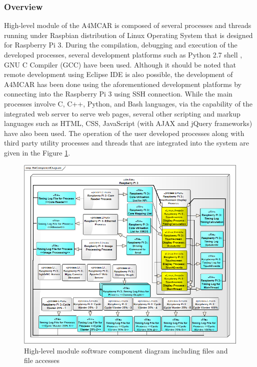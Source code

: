 \subsubsection{Overview}
High-level module of the A4MCAR is composed of several processes and threads running under Raspbian \cite{raspbiandownload} distribution of Linux Operating System that is designed for Raspberry Pi 3.  During the compilation, debugging and execution of the developed processes, several development platforms such as Python 2.7 shell \cite{python27}, GNU C Compiler (GCC) \cite{gcc} have been used. Although it should be noted that remote development using Eclipse IDE \cite{remotedebuggingeclipse} is also possible, the development of A4MCAR has been done using the aforementioned development platforms by connecting into the Raspberry Pi 3 using SSH connection. While the main processes involve C, C++, Python, and Bash \cite{bash} languages, via the capability of the integrated web server to serve web pages, several other scripting and markup languages such as HTML, CSS, JavaScript (with AJAX \cite{howajaxworks} and jQuery \cite{jquery} frameworks) have also been used. The operation of the user developed processes along with third party utility processes and threads that are integrated into the system are given in the Figure \ref{fig:rpicomponents}. 
\begin{figure}[!ht]
	\centering
	\includegraphics[width=\textwidth]{content/images/rpicomponents.png}
	\caption{High-level module software component diagram including files and file accesses}
	\label{fig:rpicomponents}
\end{figure}

